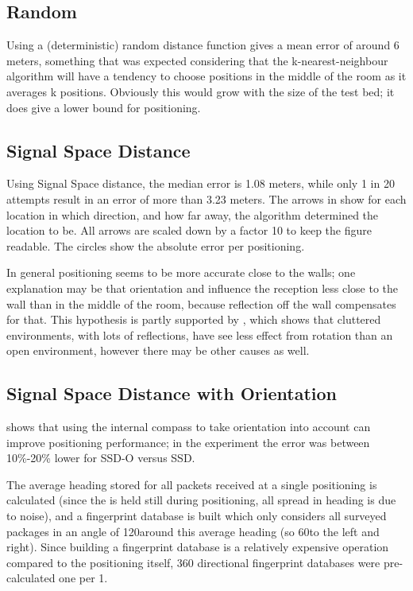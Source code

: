 \subsection{Random}
Using a (deterministic) random distance function gives a mean error of around 6 meters, something that was expected considering that the k-nearest-neighbour algorithm will have a tendency to choose positions in the middle of the room as it averages k positions.
Obviously this would grow with the size of the test bed; it does give a lower bound for positioning.
\subsection{Signal Space Distance}
Using Signal Space distance, the median error is 1.08 meters, while only 1 in 20 attempts result in an error of more than 3.23 meters.
The arrows in  show for each location in which direction, and how far away, the algorithm determined the location to be.
All arrows are scaled down by a factor 10 to keep the figure readable.
The circles show the absolute error per positioning.

In general positioning seems to be more accurate close to the walls; one explanation may be that orientation and \mpi influence the reception less close to the wall than in the middle of the room, because reflection off the wall compensates for that.
This hypothesis is partly supported by , which shows that cluttered environments, with lots of reflections, have see less effect from rotation than an open environment, however there may be other causes as well.


\subsection{Signal Space Distance with Orientation}
\label{sec:architecture-measurements-ssd-o}
 shows that using the internal compass to take orientation into account can improve positioning performance; in the experiment the error was between 10\%-20\% lower for SSD-O versus SSD.

The average heading stored for all packets received at a single positioning is calculated (since the \device is held still during positioning, all spread in heading is due to noise), and a fingerprint database is built which only considers all surveyed packages in an angle of 120\textdegree around this average heading (so 60\textdegree to the left and right).
Since building a fingerprint database is a relatively expensive operation compared to the positioning itself, 360 directional fingerprint databases were pre-calculated one per 1\textdegree.

